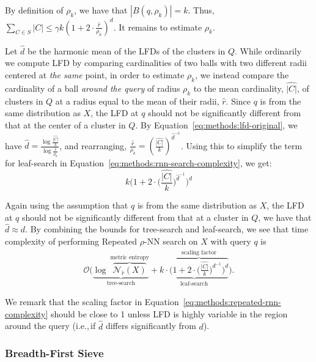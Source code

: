 By definition of $\rho_k$, we have that $|B(q, \rho_k)| = k$.
Thus, $\sum_{C \in S} |C| \leq \gamma k \left( 1 + 2 \cdot \frac{\hat{r}}{\rho_k} \right)^d$.
It remains to estimate $\rho_k$.

Let $\hat{d}$ be the harmonic mean of the LFDs of the clusters in $Q$.
While ordinarily we compute LFD by comparing cardinalities of two balls with two different radii centered at \textit{the same} point, in order to estimate $\rho_k$, we instead compare the cardinality of a ball \textit{around the query} of radius $\rho_k$ to the mean cardinality, $\hat{|C|}$, of clusters in $Q$ at a radius equal to the mean of their radii, $\hat{r}$.
Since $q$ is from the same distribution as $X$, the LFD at $q$ should not be significantly different from that at the center of a cluster in $Q$.
By Equation~\ref{eq:methods:lfd-original}, we have $\hat{d} = \frac{\log{}\frac{\hat{|C|}}{k}}{\log{}\frac{\hat{r}}{\rho_k}}$, and rearranging, $\frac{\hat{r}}{\rho_k} = \left( \frac{\hat{|C|}}{k} \right)^{\hat{d}^{-1}}$.
Using this to simplify the term for leaf-search in Equation~\ref{eq:methods:rnn-search-complexity}, we get:
\begin{equation*}
    k \Bigg( 1 + 2 \cdot \bigg( \frac{\hat{|C|}}{k} \bigg) ^ {\hat{d}^{-1}} \Bigg)^d
\end{equation*}

Again using the assumption that $q$ is from the same distribution as $X$, the LFD at $q$ should not be significantly different from that at a cluster in $Q$, we have that $\hat{d} \approx d$.
By combining the bounds for tree-search and leaf-search, we see that time complexity of performing Repeated $\rho$-NN search on $X$ with query $q$ is
\begin{gather}
    \mathcal{O}
    \Bigg(
        \underbrace{
            \log~\overbrace{\mathcal{N}_{\hat{r}}(X)}^{\textrm{metric entropy}}
        }_{\textrm{tree-search}}
        +
        \underbrace{
            k \cdot
            \overbrace{\bigg( 1 + 2 \cdot \Big( \frac{\hat{|C|}}{k} \Big) ^ {d^{-1}} \bigg)^d}^{\textrm{scaling factor}}
        }_{\textrm{leaf-search}}
    \Bigg).
    \label{eq:methods:repeated-rnn-complexity}
\end{gather}

We remark that the scaling factor in Equation~\ref{eq:methods:repeated-rnn-complexity} should be close to 1 unless LFD is highly variable in the region around the query (i.e.,\,if $\hat{d}$ differs significantly from $d$).


\subsubsection{Breadth-First Sieve}
\label{sec:methods:knn-search:bredth-first-sieve}

